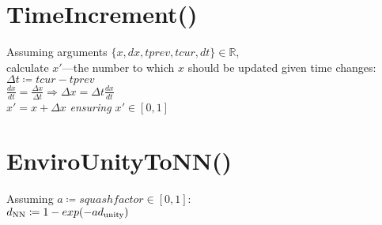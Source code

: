 \documentclass[12pt]{article}
\begin{document}

	\section*{TimeIncrement()}
	
	Assuming arguments $\{x, dx, tprev, tcur, dt\}\in\mathbb{R}$,\\
	calculate $x'$—the number to which $x$ should be updated given time changes:\\
	
	$\Delta t\coloneqq tcur - tprev$\\
	
	$\frac{dx}{dt} = \frac{\Delta x}{\Delta t}\Rightarrow\Delta x = \Delta t\frac{dx}{dt}$\\
	
	$x' = x + \Delta x$ \textit{ensuring $x'\in [0,1]$}\\

	\section*{EnviroUnityToNN()}
	
	Assuming $a\coloneqq squash factor\in [0, 1]$:\\
	
	$d\textsubscript{NN}\coloneqq 1 - exp(-a d\textsubscript{unity})$\\
	
\end{document}
